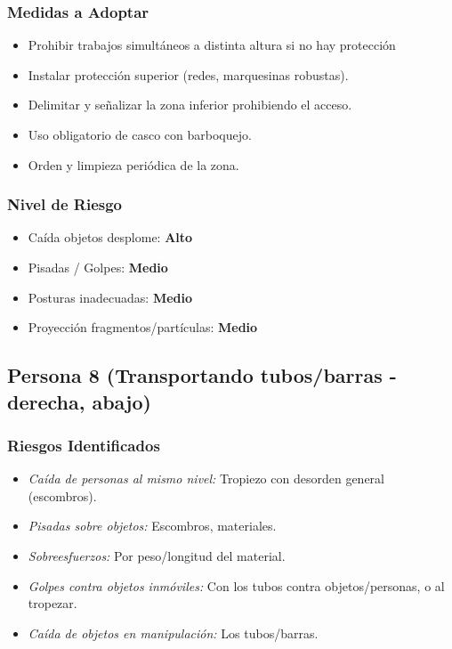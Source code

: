 \documentclass[12pt,a4paper]{article}
\begin{document}
	\subsubsection{Medidas a Adoptar}
	\begin{itemize}
		\item Prohibir trabajos simultáneos a distinta altura si no hay protección
		\item Instalar protección superior (redes, marquesinas robustas).
		\item Delimitar y señalizar la zona inferior prohibiendo el acceso.
		\item Uso obligatorio de casco con barboquejo.
		\item Orden y limpieza periódica de la zona.
	\end{itemize}
	
	\subsubsection{Nivel de Riesgo}
	\begin{itemize}
		\item Caída objetos desplome: \textbf{Alto}
		\item Pisadas / Golpes: \textbf{Medio}
		\item Posturas inadecuadas: \textbf{Medio}
		\item Proyección fragmentos/partículas: \textbf{Medio}
	\end{itemize}
	
	\bigskip\hrulefill\bigskip
	
	\subsection{Persona 8 (Transportando tubos/barras - derecha, abajo)}
	
	\subsubsection{Riesgos Identificados}
	\begin{itemize}
		\item \textit{Caída de personas al mismo nivel:} Tropiezo con desorden general (escombros).
		\item \textit{Pisadas sobre objetos:} Escombros, materiales.
		\item \textit{Sobreesfuerzos:} Por peso/longitud del material.
		\item \textit{Golpes contra objetos inmóviles:} Con los tubos contra objetos/personas, o al tropezar.
		\item \textit{Caída de objetos en manipulación:} Los tubos/barras.
	\end{itemize}
	
\end{document}
